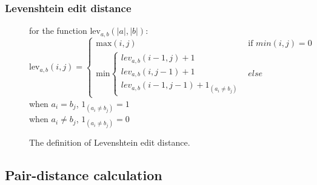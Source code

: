 \documentclass[t]{beamer}
\begin{document}
  \begin{frame}
    \frametitle{Levenshtein edit distance}

    \begin{figure}
      \vspace{5mm}
      \centering
      for the function $\mbox{lev}_{a,b}(|a|,|b|)$:\\
      $$\mbox{lev}_{a,b}(i,j) = 
      \left\{
      \begin{array}{ll}
        \mbox{max}(i,j) & \mbox{if }min(i,j) = 0\\
        \mbox{min}\left\{
        \begin{array}{lll}
          lev_{a,b}(i-1,j)+1\\
          lev_{a,b}(i,j-1)+1\\
          lev_{a,b}(i-1,j-1)+1_{(a_i{\neq}b_j)}
        \end{array}
        \right.
        & else 
      \end{array}
      \right.$$
      when $a_i = b_j$, $1_{(a_i{\neq}b_j)} = 1$\\
      when  $a_i \neq b_j$, $1_{(a_i{\neq}b_j)} = 0$
      \caption{The definition of Levenshtein edit distance.}
      \label{fig:levdef}
    \end{figure}

  \end{frame}

  \subsection{Pair-distance calculation}
\end{document}

